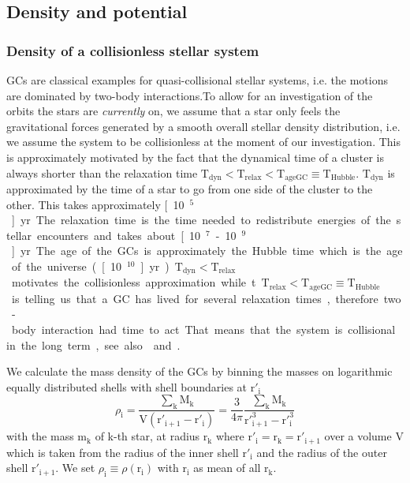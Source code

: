 \subsection{Density and potential}\label{sec:dens_pot_theory}
\subsubsection{Density of a collisionless stellar system}\label{sec:density}
\acp{GC} are classical examples for quasi-collisional stellar systems, i.e. the motions are dominated by two-body interactions.To allow for an investigation of the orbits the stars are \emph{currently} on, we assume that a star only feels the gravitational forces generated by a smooth overall stellar density distribution, i.e. we assume the system to be collisionless at the moment of our investigation. This is approximately motivated by the fact that the dynamical time of a cluster is always shorter than the relaxation time \(\mathrm{T_{dyn} < T_{relax} < T_{ageGC} \equiv T_{Hubble}}\). \(\mathrm{T_{dyn}}\) is approximated by the time of a star to go from one side of the cluster to the other. This takes approximately \unit[10\(^5\)]{yr}. The relaxation time is the time needed to redistribute energies of the stellar encounters and takes about \unit[10\(^7\) - 10\(^9\)]{yr}. The age of the \acp{GC} is approximately the Hubble time which is the age of the universe (\unit[10\(^{10}\)]{yr}). \(\mathrm{T_{dyn} < T_{relax}}\) motivates the collisionless approximation while t\(\mathrm{T_{relax} < T_{ageGC} \equiv T_{Hubble}}\) is telling us that a \ac{GC} has lived for several relaxation times, therefore two-body interaction had time to act. That means that the system is collisional in the long term, see also \citet[p.555]{2008gady.book.....B} and \citet{2012MNRAS.423.3589W}. 
\par We calculate the mass density of the \acp{GC} by binning the masses on logarithmic equally distributed shells with shell boundaries at $\mathrm{r'_i}$
\begin{equation}\label{eq:density}
\rho_\mathrm{i}=\frac{\sum_\mathrm{k}\mathrm{M_k}}{\mathrm{V(r'_{i+1}-r'_i)}}=\frac{3}{4\pi}\frac{\sum_\mathrm{k}\mathrm{M_k}}{\mathrm{r'_{i+1}^3-r'_i^3}}
\end{equation} 
with the mass m$_\mathrm{k}$ of k-th star, at radius r$_\mathrm{k}$ where  $\mathrm{r'_i=r_k=r'_{i+1}}$  over a volume V which is taken from the radius of the inner shell \(\mathrm{r'_{i}}\) and the radius of the outer shell \(\mathrm{r'_{i+1}}\). We set $\rho_\mathrm{i}\equiv\rho(\mathrm{r_i})$ with r$_\mathrm{i}$ as mean of all r$_\mathrm{k}$.

